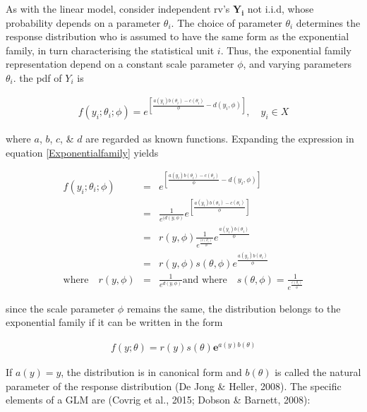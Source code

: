 \documentclass{DissertateUSU}
\begin{document}
As with the linear model, consider independent rv's \(\mathbf{Y_i}\) not
i.i.d, whose probability depends on a parameter \(\theta_i\). The choice
of parameter \(\theta_i\) determines the response distribution who is
assumed to have the same form as the exponential family, in turn
characterising the statistical unit \(i\). Thus, the exponential family
representation depend on a constant scale parameter \(\phi\), and
varying parameters \(\theta_i\). the pdf of \(Y_i\) is

\singlespacing

\begin{eqnarray}\label{Exponentialfamily}
f(y_i;\theta_i;\phi) = e^{\left[\frac{a(y_i)b(\theta_i) -c(\theta_i)}{\phi}-d(y_i,\phi)\right]}, \quad y_i \in X 
\end{eqnarray} \doublespacing

where \(a\), \(b\), \(c\), \& \(d\) are regarded as known functions.
Expanding the expression in equation \ref{Exponentialfamily} yields

\singlespacing

\begin{eqnarray}\label{Exponentialfamily}
f(y_i;\theta_i;\phi) &=& e^{\left[\frac{a(y_i)b(\theta_i) -c(\theta_i)}{\phi}-d(y_i,\phi)\right]} \nonumber\\
 &=& \frac{1}{e^{(d(y,\phi)}}e^{\left[\frac{a(y_i)b(\theta_i) -c(\theta_i)}{\phi}\right]} \nonumber\\
 &=& r(y,\phi)\frac{1}{e^{\frac{(c(\theta_i)}{\phi}}}e^{\frac{a(y_i)b(\theta_i)}{\phi}} \nonumber\\
 &=& r(y,\phi)s(\theta,\phi)e^{\frac{a(y_i)b(\theta_i)}{\phi}}\\
 \mbox{where} \quad r(y,\phi)&=& \frac{1}{e^{d(y,\phi)}} \mbox{and where}\quad s(\theta,\phi) = \frac{1}{e^{\frac{c(\theta_i)}{\phi}}}
\end{eqnarray} \doublespacing

since the scale parameter \(\phi\) remains the same, the distribution
belongs to the exponential family if it can be written in the form

\singlespacing

\begin{eqnarray}\label{Exponential}
f(y;\theta) = r(y)s(\theta)\mathbf{e}^{a(y)b(\theta)}
\end{eqnarray} \doublespacing

If \(a(y) = y\), the distribution is in canonical form and \(b(\theta)\)
is called the natural parameter of the response distribution (De Jong \&
Heller, 2008). The specific elements of a GLM are (Covrig et al., 2015;
Dobson \& Barnett, 2008):
\end{document}
